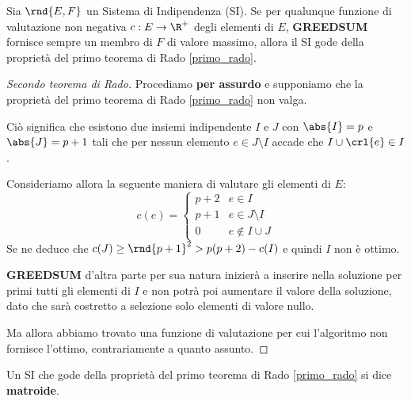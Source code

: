 \documentclass[\main/main.tex]{subfiles}
\begin{document}
\begin{theorem}
  Sia \(\rnd{E, F}\) un Sistema di Indipendenza (SI). Se per qualunque funzione di valutazione non negativa \(c: E \rightarrow \R^+\) degli elementi di \(E\), \textbf{GREEDSUM} fornisce sempre un membro di \(F\) di valore massimo, allora il SI gode della proprietà del primo teorema di Rado \ref{primo_rado}.
\end{theorem}
\begin{proof}[Secondo teorema di Rado]
  Procediamo \textbf{per assurdo} e supponiamo che la proprietà del primo teorema di Rado \ref{primo_rado} non valga.

  Ciò significa che esistono due insiemi indipendente \(I\) e \(J\) con \(\abs{I} = p\) e \(\abs{J} = p+1\) tali che per nessun elemento \(e \in J \setminus I\) accade che \(I \cup \crl{e} \in I\).

  Consideriamo allora la seguente maniera di valutare gli elementi di \(E\):
  \[
    c(e) = \begin{cases}
      p+2 & e \in I            \\
      p+1 & e \in J\setminus I \\
      0   & e \not\in I \cup J
    \end{cases}
  \]
  Se ne deduce che \(c(J) \geq \rnd{p+1}^2 > p(p+2) - c(I)\) e quindi \(I\) non è ottimo.

  \textbf{GREEDSUM} d'altra parte per sua natura inizierà a inserire nella soluzione per primi tutti gli elementi di \(I\) e non potrà poi aumentare il valore della soluzione, dato che sarà costretto a selezione solo elementi di valore nullo.

  Ma allora abbiamo trovato una funzione di valutazione per cui l'algoritmo non fornisce l'ottimo, contrariamente a quanto assunto.
\end{proof}
\begin{definition}[Matroide]
  Un SI che gode della proprietà del primo teorema di Rado \ref{primo_rado} si dice \textbf{matroide}.
\end{definition}
\end{document}
